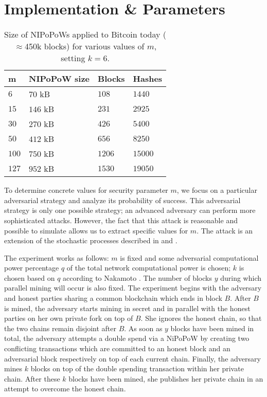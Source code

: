 \section{Implementation \& Parameters}

\begin{table}
  \caption{
    \label{table.size}
    Size of NIPoPoWs applied to Bitcoin today
    ($\approx$450k blocks) for various values of $m$,
    setting $k = 6$.
  }
  \centering
  \begin{tabular}{l|l|l|l}
      {\bf m}  & {\bf NIPoPoW size} & {\bf Blocks} & {\bf
      Hashes}\\
      \hline
      $6$   & $70$  kB & $108$ & $1440$  \\
      $15$  & $146$ kB & $231$ & $2925$  \\
      $30$  & $270$ kB & $426$ & $5400$  \\
      $50$  & $412$ kB & $656$ & $8250$ \\
      $100$ & $750$ kB & $1206$ & $15000$ \\
      $127$ & $952$ kB & $1530$ & $19050$ \\
  \end{tabular}
\end{table}

To determine concrete values for security parameter $m$, we focus on a
particular adversarial strategy and analyze its probability of success. This
adversarial strategy is only one possible strategy; an advanced adversary can
perform more sophisticated attacks. However, the fact that this attack is
reasonable and possible to simulate allows us to extract specific values for
$m$. The attack is an extension of the stochastic processes described in
\cite{bitcoin} and \cite{rosenfeld}.

The experiment works as follows: $m$ is fixed and some adversarial computational
power percentage $q$ of the total network computational power is chosen; $k$ is
chosen based on $q$ according to Nakamoto \cite{bitcoin}. The number of blocks
$y$ during which parallel mining will occur is also fixed. The experiment begins
with the adversary and honest parties sharing a common blockchain which ends in
block $B$. After $B$ is mined, the adversary starts mining in secret and in
parallel with the honest parties on her own private fork on top of $B$. She
ignores the honest chain, so that the two chains remain disjoint after $B$. As
soon as $y$ blocks have been mined in total, the adversary attempts a double
spend via a NiPoPoW 
by creating two conflicting transactions which are committed to an honest
block and an adversarial block respectively on top of each current chain.
Finally, the adversary mines $k$ blocks on top of the double spending
transaction within her private chain. After these $k$ blocks have been mined,
she publishes her private chain in an attempt to overcome the honest chain.

